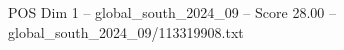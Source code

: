 \begin{textsample}{POS Dim 1 – global\_south\_2024\_09 – Score 28.00 – global\_south\_2024\_09/113319908.txt}
\end{textsample}
